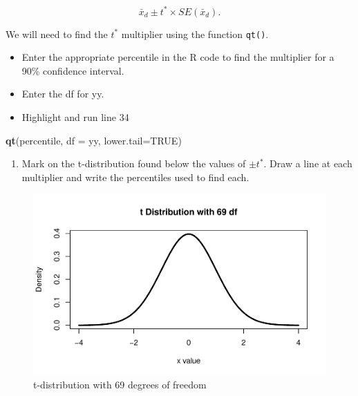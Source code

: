 \documentclass[
]{report}
\newenvironment{Shaded}{\begin{snugshade}}{\end{snugshade}}
\newcommand{\AttributeTok}[1]{\textcolor[rgb]{0.13,0.29,0.53}{#1}}
\newcommand{\ConstantTok}[1]{\textcolor[rgb]{0.56,0.35,0.01}{#1}}
\newcommand{\FunctionTok}[1]{\textcolor[rgb]{0.13,0.29,0.53}{\textbf{#1}}}
\newcommand{\NormalTok}[1]{#1}
\providecommand{\tightlist}{%
  \setlength{\itemsep}{0pt}\setlength{\parskip}{0pt}}
\begin{document}
\[\bar{x}_d\pm t^* \times SE(\bar{x}_d).\]

We will need to find the \(t^*\) multiplier using the function \texttt{qt()}.

\begin{itemize}
\item
  Enter the appropriate percentile in the R code to find the multiplier for a 90\% confidence interval.
\item
  Enter the df for yy.
\item
  Highlight and run line 34
\end{itemize}

\begin{Shaded}
\begin{Highlighting}[]
\FunctionTok{qt}\NormalTok{(percentile, }\AttributeTok{df =}\NormalTok{ yy, }\AttributeTok{lower.tail=}\ConstantTok{TRUE}\NormalTok{)}
\end{Highlighting}
\end{Shaded}

\vspace{1mm}

\begin{enumerate}
\def\labelenumi{\arabic{enumi}.}
\setcounter{enumi}{9}
\tightlist
\item
  Mark on the t-distribution found below the values of \(\pm t^*\). Draw a line at each multiplier and write the percentiles used to find each.
  \vspace{1mm}
\end{enumerate}

\begin{figure}

{\centering \includegraphics[width=0.7\linewidth]{11-A23-paired-theory_files/figure-latex/tstar3-1} 

}

\caption{t-distribution with 69 degrees of freedom}\label{fig:tstar3}
\end{figure}
\end{document}
